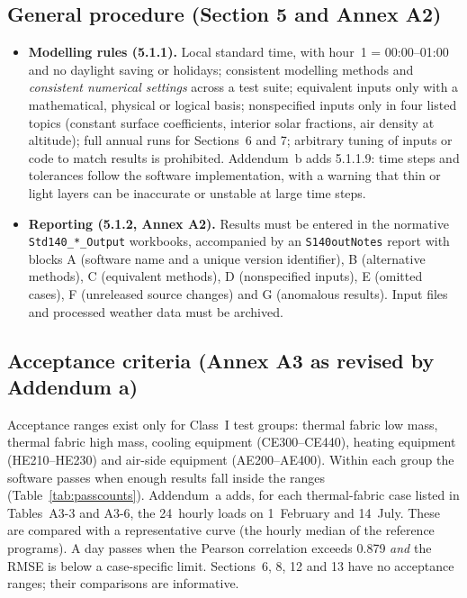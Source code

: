 \documentclass[10pt,a4paper]{article}
\newcommand{\code}[1]{\texttt{\small #1}}
\begin{document}
\subsection{General procedure (Section 5 and Annex A2)}
\begin{itemize}
\item \textbf{Modelling rules (5.1.1).} Local standard time, with hour~1 = 00:00--01:00 and no daylight saving or
holidays; consistent modelling methods and \emph{consistent numerical settings} across a test suite; equivalent
inputs only with a mathematical, physical or logical basis; nonspecified inputs only in four listed topics
(constant surface coefficients, interior solar fractions, air density at altitude); full annual runs for Sections~6
and 7; arbitrary tuning of inputs or code to match results is prohibited. Addendum~b adds 5.1.1.9: time steps and
tolerances follow the software implementation, with a warning that thin or light layers can be inaccurate or
unstable at large time steps.
\item \textbf{Reporting (5.1.2, Annex A2).} Results must be entered in the normative \code{Std140\_*\_Output}
workbooks, accompanied by an \code{S140outNotes} report with blocks A (software name and a unique version
identifier), B (alternative methods), C (equivalent methods), D (nonspecified inputs), E (omitted cases),
F (unreleased source changes) and G (anomalous results). Input files and processed weather data must be archived.
\end{itemize}

\subsection{Acceptance criteria (Annex A3 as revised by Addendum a)}
Acceptance ranges exist only for Class~I test groups: thermal fabric low mass, thermal fabric high mass, cooling
equipment (CE300--CE440), heating equipment (HE210--HE230) and air-side equipment (AE200--AE400). Within each group
the software passes when enough results fall inside the ranges (Table~\ref{tab:passcounts}). Addendum~a adds, for each
thermal-fabric case listed in Tables~A3-3 and A3-6, the 24~hourly loads on 1~February and 14~July. These are
compared with a representative curve (the hourly median of the reference programs). A day passes when the Pearson
correlation exceeds 0.879 \emph{and} the RMSE is below a case-specific limit. Sections~6, 8, 12 and 13 have no
acceptance ranges; their comparisons are informative.
\end{document}
